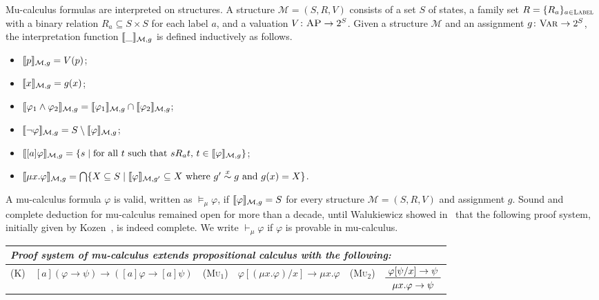 \documentclass[acmsmall,review,anonymous]{acmart}
\newcommand{\imp}{\to}
\newcommand{\Var}{\textnormal{\textsc{Var}}}
\newcommand{\MM}{\mathcal{M}}
\newcommand{\pset}[1]{2^{#1}}
\newcommand{\simon}[1]{\overset{#1}{\sim}}
\newcommand{\simx}{\simon{x}}
\newcommand{\prule}[1]{\textsc{(#1)}}
\newcommand{\AP}{\textsc{AP}}
\newcommand{\Label}{\textsc{Label}}
\DeclarePairedDelimiter{\bracket}{\llbracket}{\rrbracket}
\begin{document}
Mu-calculus formulas are interpreted on structures.
A structure $\MM = (S, R, V)$ consists of
a set $S$ of states,
a family set $R = \{R_a\}_{a \in \Label}$ with a binary relation $R_a \subseteq S \times S$
for each label $a$,
and a valuation $V \colon \AP \to \pset{S}$.
Given a structure $\MM$ and an assignment $g \colon \Var \to \pset{S}$,
the interpretation function
$\bracket{\_}_{\MM,g}$ is defined inductively as follows.
\begin{itemize}
\item $\bracket{p}_{\MM,g} = V(p)$;
\item $\bracket{x}_{\MM,g} = g(x)$;
\item $\bracket{\varphi_1 \wedge \varphi_2}_{\MM,g} =
       \bracket{\varphi_1}_{\MM,g} \cap
       \bracket{\varphi_2}_{\MM,g}$;
\item $\bracket{\neg \varphi}_{\MM,g} =
       S \setminus \bracket{\varphi}_{\MM,g}$;    
\item $\bracket{[a]\varphi}_{\MM,g} =
       \{ s \mid \text{for all $t$ such that $s R_a t$, 
       	  $t \in \bracket{\varphi}_{\MM,g}$} \}$;
\item $\bracket{\mu x . \varphi}_{\MM,g} =
       \bigcap \{ X \subseteq S \mid \bracket{\varphi}_{\MM,g'} \subseteq X
       \text{ where $g' \simx g$ and $g(x) = X$} \}$.
\end{itemize}
A mu-calculus formula $\varphi$ is valid, written as $\vDash_\mu \varphi$,
if $\bracket{\varphi}_{\MM,g} = S$ for every structure $\MM = (S,R,V)$ and assignment $g$.
Sound and complete deduction for mu-calculus remained open for more than a decade,
until Walukiewicz showed in~\cite{bibid} that
the following proof system, initially given by Kozen~\cite{bibid}, 
is indeed complete.
We write $\vdash_\mu \varphi$ if $\varphi$ is provable in mu-calculus.
\begin{center}
\begin{tabular}{lllllm{2cm}}
	\multicolumn{6}{l}{\em Proof system of mu-calculus extends
		propositional calculus with the following:}
	\\\hline
	\prule{K}&
	$[a](\varphi \imp \psi) \imp
	([a]\varphi \imp [a]\psi)$
	&
	\prule{Mu$_1$}&
	$\varphi[(\mu x . \varphi) / x] \imp \mu x . \varphi$
	&
	\prule{Mu$_2$}&
	$\prftree{\varphi[\psi / x] \imp \psi}{\mu x . \varphi \imp \psi}$
\end{tabular}
\end{center}
\end{document}
